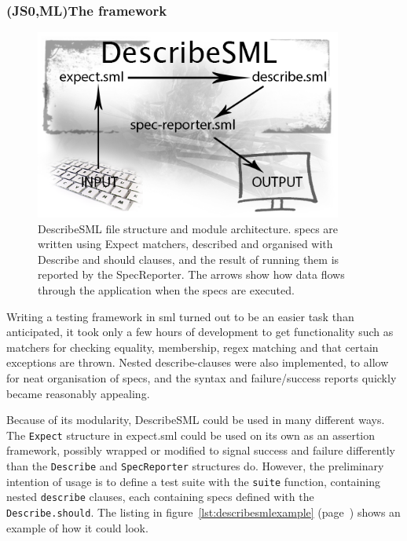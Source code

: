 \documentclass[11pt]{article}
\begin{document}
\subsubsection{(JS0,ML)The framework}

\begin{figure}[ht!]
\centering
\includegraphics[width=0.9\textwidth]{pics/DescribeSML.png}
\caption{DescribeSML file structure and module architecture. \Glspl{spec} are written using Expect \glspl{matcher}, described and organised with Describe and should clauses, and the result of running them is reported by the SpecReporter. The arrows show how data flows through the application when the \glspl{spec} are executed.}
\label{fig:describesml}
\end{figure}

Writing a testing framework in \gls{sml} turned out to be an easier task than anticipated, it took only a few hours of development to get functionality such as \glspl{matcher} for checking equality, membership, regex matching and that certain exceptions are thrown. Nested describe-clauses were also implemented, to allow for neat organisation of \glspl{spec}, and the syntax and failure/success reports quickly became reasonably appealing.

Because of its modularity, DescribeSML could be used in many different ways. The \texttt{Expect} structure in expect.sml could be used on its own as an assertion framework, possibly wrapped or modified to signal success and failure differently than the \texttt{Describe} and \texttt{SpecReporter} structures do. However, the preliminary intention of usage is to define a test suite with the \texttt{suite} function, containing nested \texttt{describe} clauses, each containing \glspl{spec} defined with the \texttt{Describe.should}. The listing in figure~\ref{lst:describesmlexample} (page~\pageref{lst:describesmlexample}) shows an example of how it could look.
\end{document}
